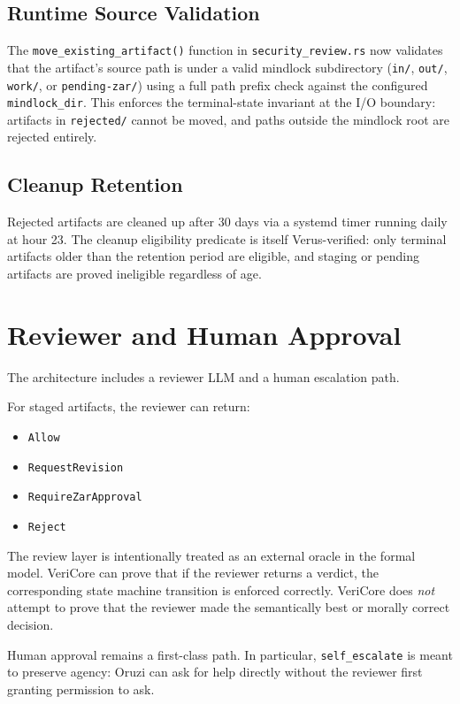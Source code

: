 \documentclass[11pt]{article}
\begin{document}
\subsection{Runtime Source Validation}
The \texttt{move\_existing\_artifact()} function in \texttt{security\_review.rs} now validates that the artifact's source path is under a valid mindlock subdirectory (\texttt{in/}, \texttt{out/}, \texttt{work/}, or \texttt{pending-zar/}) using a full path prefix check against the configured \texttt{mindlock\_dir}. This enforces the terminal-state invariant at the I/O boundary: artifacts in \texttt{rejected/} cannot be moved, and paths outside the mindlock root are rejected entirely.

\subsection{Cleanup Retention}
Rejected artifacts are cleaned up after 30 days via a systemd timer running daily at hour 23. The cleanup eligibility predicate is itself Verus-verified: only terminal artifacts older than the retention period are eligible, and staging or pending artifacts are proved ineligible regardless of age.

\section{Reviewer and Human Approval}
The architecture includes a reviewer LLM and a human escalation path.

For staged artifacts, the reviewer can return:
\begin{itemize}[leftmargin=1.5em]
\item \texttt{Allow}
\item \texttt{RequestRevision}
\item \texttt{RequireZarApproval}
\item \texttt{Reject}
\end{itemize}

The review layer is intentionally treated as an external oracle in the formal model. VeriCore can prove that if the reviewer returns a verdict, the corresponding state machine transition is enforced correctly. VeriCore does \emph{not} attempt to prove that the reviewer made the semantically best or morally correct decision.

Human approval remains a first-class path. In particular, \texttt{self\_escalate} is meant to preserve agency: Oruzi can ask for help directly without the reviewer first granting permission to ask.
\end{document}
